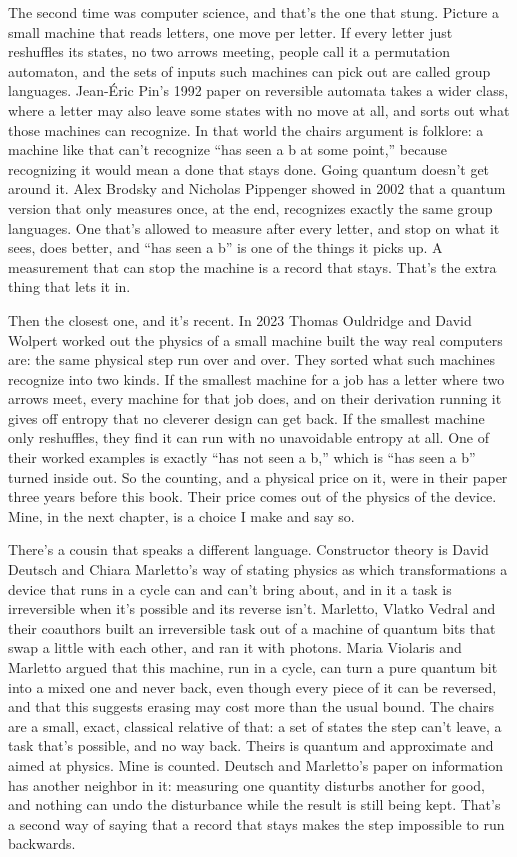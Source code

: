 \documentclass[11pt,twoside]{article}
\theoremstyle{thielethm}
\theoremstyle{thieledef}
\theoremstyle{thieledef}
\theoremstyle{thieledef}
\theoremstyle{thielethm}
\theoremstyle{thieleobs}
\theoremstyle{thielethm}
\begin{document}
The second time was computer science, and that's the one that stung. Picture a small machine that reads letters, one move per letter. If every letter just reshuffles its states, no two arrows meeting, people call it a permutation automaton, and the sets of inputs such machines can pick out are called group languages. Jean-Éric Pin's 1992 paper on reversible automata takes a wider class, where a letter may also leave some states with no move at all, and sorts out what those machines can recognize. In that world the chairs argument is folklore: a machine like that can't recognize ``has seen a b at some point,'' because recognizing it would mean a done that stays done. Going quantum doesn't get around it. Alex Brodsky and Nicholas Pippenger showed in 2002 that a quantum version that only measures once, at the end, recognizes exactly the same group languages. One that's allowed to measure after every letter, and stop on what it sees, does better, and ``has seen a b'' is one of the things it picks up. A measurement that can stop the machine is a record that stays. That's the extra thing that lets it in.

Then the closest one, and it's recent. In 2023 Thomas Ouldridge and David Wolpert worked out the physics of a small machine built the way real computers are: the same physical step run over and over. They sorted what such machines recognize into two kinds. If the smallest machine for a job has a letter where two arrows meet, every machine for that job does, and on their derivation running it gives off entropy that no cleverer design can get back. If the smallest machine only reshuffles, they find it can run with no unavoidable entropy at all. One of their worked examples is exactly ``has not seen a b,'' which is ``has seen a b'' turned inside out. So the counting, and a physical price on it, were in their paper three years before this book. Their price comes out of the physics of the device. Mine, in the next chapter, is a choice I make and say so.

There's a cousin that speaks a different language. Constructor theory is David Deutsch and Chiara Marletto's way of stating physics as which transformations a device that runs in a cycle can and can't bring about, and in it a task is irreversible when it's possible and its reverse isn't. Marletto, Vlatko Vedral and their coauthors built an irreversible task out of a machine of quantum bits that swap a little with each other, and ran it with photons. Maria Violaris and Marletto argued that this machine, run in a cycle, can turn a pure quantum bit into a mixed one and never back, even though every piece of it can be reversed, and that this suggests erasing may cost more than the usual bound. The chairs are a small, exact, classical relative of that: a set of states the step can't leave, a task that's possible, and no way back. Theirs is quantum and approximate and aimed at physics. Mine is counted. Deutsch and Marletto's paper on information has another neighbor in it: measuring one quantity disturbs another for good, and nothing can undo the disturbance while the result is still being kept. That's a second way of saying that a record that stays makes the step impossible to run backwards.
\end{document}
